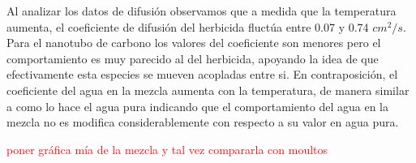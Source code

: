 Al analizar los datos de difusión observamos que a medida que la temperatura aumenta, el coeficiente de difusión del herbicida fluctúa entre 0.07 y 0.74 $cm^2/s$. Para el nanotubo de carbono los valores del coeficiente son menores  pero el comportamiento es muy parecido al del herbicida, apoyando la idea  de que efectivamente esta especies se mueven acopladas entre si. En contraposición, el coeficiente del agua en la mezcla aumenta con la temperatura, de manera similar a como lo hace el agua pura \cite{moultos2018} indicando que el comportamiento del agua en la mezcla no es modifica considerablemente con respecto a su valor en agua pura.

\textcolor{red}{poner gráfica mía de la mezcla y tal vez compararla con moultos }





